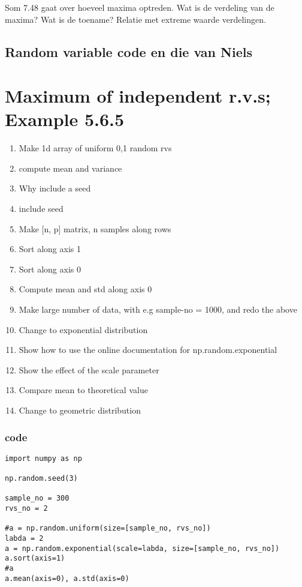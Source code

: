 \documentclass[a4paper]{article}
\begin{document}
Som 7.48 gaat over hoeveel maxima optreden. Wat is de verdeling van de maxima? Wat is de toename? Relatie met extreme waarde verdelingen. 

\subsection{Random variable code en die van Niels}
\label{sec:org57ced54}

\section{Maximum of independent r.v.s; Example 5.6.5}
\label{sec:orgb2a351d}

\begin{enumerate}
\item Make 1d array of uniform 0,1 random rvs
\item compute mean and variance
\item Why include a seed
\item include seed
\item Make [n, p] matrix, n samples along rows
\item Sort along axis  1
\item Sort along axis 0
\item Compute mean and std along axis 0
\item Make large number of data, with e.g sample-no = 1000, and redo the above
\item Change to exponential distribution
\item Show how to use the online documentation for np.random.exponential
\item Show the effect of the scale parameter
\item Compare mean to theoretical value
\item Change to geometric distribution
\end{enumerate}


\subsubsection{code}
\label{sec:orga01964c}


\begin{verbatim}
import numpy as np

np.random.seed(3)

sample_no = 300
rvs_no = 2

#a = np.random.uniform(size=[sample_no, rvs_no])
labda = 2
a = np.random.exponential(scale=labda, size=[sample_no, rvs_no])
a.sort(axis=1)
#a
a.mean(axis=0), a.std(axis=0)
\end{verbatim}
\end{document}
